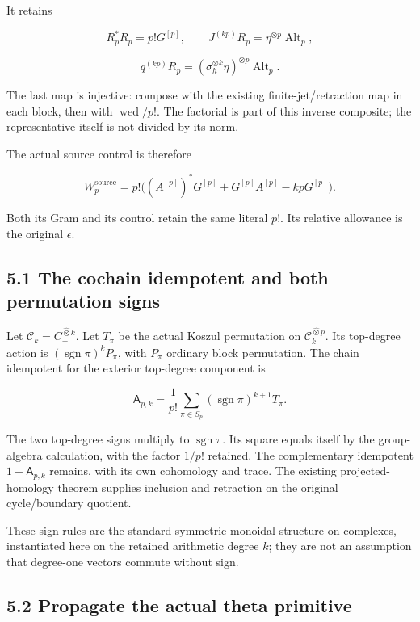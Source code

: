 \documentclass[
  11pt,
]{article}
\begin{document}
It retains

\[
R_p^*R_p=p!G^{[p]},\qquad
J^{(kp)}R_p=\eta^{\otimes p}\operatorname{Alt}_p,
\]

\[
q^{(kp)}R_p=(\sigma_h^{\otimes k}\eta)^{\otimes p}
             \operatorname{Alt}_p.
\]

The last map is injective: compose with the existing
finite-jet/retraction map in each block, then with
\(\operatorname{wed}/p!\). The factorial is part of this inverse
composite; the representative itself is not divided by its norm.

The actual source control is therefore

\[
W_p^{\mathrm{source}}=p!\bigl((A^{[p]})^*G^{[p]}+G^{[p]}A^{[p]}-kpG^{[p]}\bigr).
\]

Both its Gram and its control retain the same literal \(p!\). Its
relative allowance is the original \(\epsilon\).

\subsection{5.1 The cochain idempotent and both permutation
signs}\label{the-cochain-idempotent-and-both-permutation-signs}

Let \(\mathcal C_k=C_+^{\widehat\otimes k}\). Let \(T_\pi\) be the
actual Koszul permutation on \(\mathcal C_k^{\widehat\otimes p}\). Its
top-degree action is \((\operatorname{sgn}\pi)^kP_\pi\), with \(P_\pi\)
ordinary block permutation. The chain idempotent for the exterior
top-degree component is

\[
\boxed{
\mathsf A_{p,k}
=\frac1{p!}\sum_{\pi\in S_p}
 (\operatorname{sgn}\pi)^{k+1}T_\pi.
}
\]

The two top-degree signs multiply to \(\operatorname{sgn}\pi\). Its
square equals itself by the group-algebra calculation, with the factor
\(1/p!\) retained. The complementary idempotent \(1-\mathsf A_{p,k}\)
remains, with its own cohomology and trace. The existing
projected-homology theorem supplies inclusion and retraction on the
original cycle/boundary quotient.

These sign rules are the standard symmetric-monoidal structure on
complexes, instantiated here on the retained arithmetic degree \(k\);
they are not an assumption that degree-one vectors commute without sign.

\subsection{5.2 Propagate the actual theta
primitive}\label{propagate-the-actual-theta-primitive}
\end{document}
